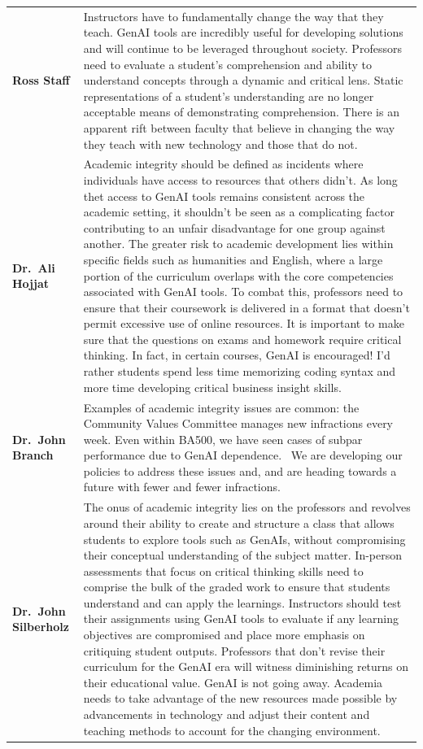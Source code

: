 \documentclass[
]{book}
\begin{document}
\begin{longtable}[]{@{}
  >{\raggedright\arraybackslash}p{}
  >{\raggedright\arraybackslash}p{}@{}}
\toprule\noalign{}
\endhead
\bottomrule\noalign{}
\endlastfoot
\textbf{Ross Staff} & Instructors have to fundamentally change the way that they teach. GenAI tools are incredibly useful for developing solutions and will continue to be leveraged throughout society. Professors need to evaluate a student's comprehension and ability to understand concepts through a dynamic and critical lens. Static representations of a student's understanding are no longer acceptable means of demonstrating comprehension. There is an apparent rift between faculty that believe in changing the way they teach with new technology and those that do not. \\
\textbf{Dr.~Ali Hojjat} & Academic integrity should be defined as incidents where individuals have access to resources that others didn't. As long thet access to GenAI tools remains consistent across the academic setting, it shouldn't be seen as a complicating factor contributing to an unfair disadvantage for one group against another. The greater risk to academic development lies within specific fields such as humanities and English, where a large portion of the curriculum overlaps with the core competencies associated with GenAI tools. To combat this, professors need to ensure that their coursework is delivered in a format that doesn't permit excessive use of online resources. It is important to make sure that the questions on exams and homework require critical thinking. In fact, in certain courses, GenAI is encouraged! I'd rather students spend less time memorizing coding syntax and more time developing critical business insight skills. \\
\textbf{Dr.~John Branch} & Examples of academic integrity issues are common: the Community Values Committee manages new infractions every week. Even within BA500, we have seen cases of subpar performance due to GenAI dependence.~ We are developing our policies to address these issues and, and are heading towards a future with fewer and fewer infractions. \\
\textbf{Dr.~John Silberholz} & The onus of academic integrity lies on the professors and revolves around their ability to create and structure a class that allows students to explore tools such as GenAIs, without compromising their conceptual understanding of the subject matter. In-person assessments that focus on critical thinking skills need to comprise the bulk of the graded work to ensure that students understand and can apply the learnings. Instructors should test their assignments using GenAI tools to evaluate if any learning objectives are compromised and place more emphasis on critiquing student outputs. Professors that don't revise their curriculum for the GenAI era will witness diminishing returns on their educational value. GenAI is not going away. Academia needs to take advantage of the new resources made possible by advancements in technology and adjust their content and teaching methods to account for the changing environment. \\

\end{longtable}
\end{document}
